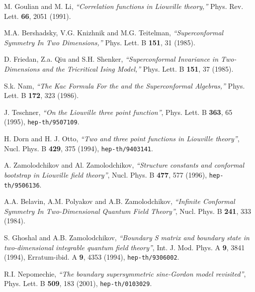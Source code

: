 \documentclass[a4paper,12pt]{article}
\begin{document}
 M. Goulian and M. Li,
    {\sl ``Correlation functions in Liouville theory,''}
    Phys. Rev. Lett. {\bf 66}, 2051 (1991).

 M.A. Bershadsky, V.G. Knizhnik and M.G. Teitelman,
    {\sl ``Superconformal Symmetry In Two Dimensions,''}
    Phys. Lett. B {\bf 151}, 31 (1985).

 D. Friedan, Z.a. Qiu and S.H. Shenker,
    {\sl ``Superconformal Invariance in Two-Dimensions
           and the Tricritical Ising Model,''}
    Phys. Lett. B {\bf 151}, 37 (1985).

 S.k. Nam,
    {\sl ``The Kac Formula For the \coordHE{} and the \coordHE{}
           Superconformal Algebras,''}
    Phys. Lett. B {\bf 172}, 323 (1986).

 J. Teschner,
    {\sl ``On the Liouville three point function''},
    Phys. Lett. B {\bf 363}, 65 (1995), {\tt hep-th/9507109}.

 H. Dorn and H. J. Otto,
    {\sl ``Two and three point functions in Liouville theory''},
    Nucl. Phys. B {\bf 429}, 375 (1994), {\tt hep-th/9403141}.

 A. Zamolodchikov and Al. Zamolodchikov,
    {\sl ``Structure constants and conformal bootstrap
           in Liouville field theory''},
    Nucl. Phys. B {\bf 477}, 577 (1996), {\tt hep-th/9506136}.

 A.A. Belavin, A.M. Polyakov and A.B. Zamolodchikov,
    {\sl ``Infinite Conformal Symmetry In Two-Dimensional
           Quantum Field Theory''},
    Nucl. Phys. B {\bf 241}, 333 (1984).

 S. Ghoshal and A.B. Zamolodchikov,
    {\sl ``Boundary S matrix and boundary state
           in two-dimensional integrable quantum field theory''},
    Int. J. Mod. Phys. A {\bf 9}, 3841 (1994),
    Erratum-ibid. A {\bf 9}, 4353 (1994),
    {\tt hep-th/9306002}.

 R.I. Nepomechie,
    {\sl ``The boundary supersymmetric sine-Gordon model revisited''},
    Phys. Lett. B {\bf 509}, 183 (2001),
    {\tt hep-th/0103029}.
\end{document}
